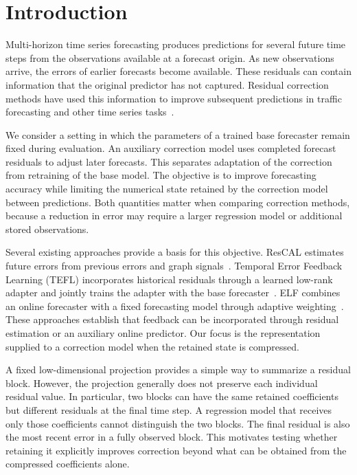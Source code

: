 \section{Introduction}
\label{sec:introduction}

Multi-horizon time series forecasting produces predictions for several future time steps from the observations available at a forecast origin. As new observations arrive, the errors of earlier forecasts become available. These residuals can contain information that the original predictor has not captured. Residual correction methods have used this information to improve subsequent predictions in traffic forecasting and other time series tasks~\cite{rescal2022,tefl2026}.

We consider a setting in which the parameters of a trained base forecaster remain fixed during evaluation. An auxiliary correction model uses completed forecast residuals to adjust later forecasts. This separates adaptation of the correction from retraining of the base model. The objective is to improve forecasting accuracy while limiting the numerical state retained by the correction model between predictions. Both quantities matter when comparing correction methods, because a reduction in error may require a larger regression model or additional stored observations.

Several existing approaches provide a basis for this objective. ResCAL estimates future errors from previous errors and graph signals~\cite{rescal2022}. Temporal Error Feedback Learning (TEFL) incorporates historical residuals through a learned low-rank adapter and jointly trains the adapter with the base forecaster~\cite{tefl2026}. ELF combines an online forecaster with a fixed forecasting model through adaptive weighting~\cite{elf2025}. These approaches establish that feedback can be incorporated through residual estimation or an auxiliary online predictor. Our focus is the representation supplied to a correction model when the retained state is compressed.

A fixed low-dimensional projection provides a simple way to summarize a residual block. However, the projection generally does not preserve each individual residual value. In particular, two blocks can have the same retained coefficients but different residuals at the final time step. A regression model that receives only those coefficients cannot distinguish the two blocks. The final residual is also the most recent error in a fully observed block. This motivates testing whether retaining it explicitly improves correction beyond what can be obtained from the compressed coefficients alone.

